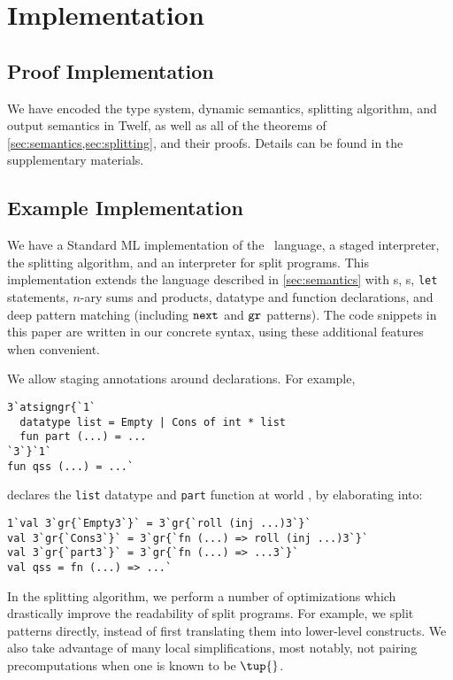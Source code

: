 
\section {Implementation}
\label{sec:implementation}

\subsection {Proof Implementation}

We have encoded the type system, dynamic semantics, splitting algorithm, and output semantics in Twelf,
as well as all of the theorems of \ref{sec:semantics,sec:splitting}, and their proofs. 
Details can be found in the supplementary materials.

\subsection {Example Implementation}

\begin{abstrsyn}
We have a Standard ML implementation of the \lang\ language, a staged
interpreter, the splitting algorithm, and an interpreter for split programs.
This implementation extends the language described in \ref{sec:semantics} with 
\rmint{}s,
\rmbool{}s,
\texttt{let} statements,
$n$-ary sums and products,
datatype and function declarations, and
deep pattern matching (including ${\tt next}{}$ and ${\tt gr}{}$ patterns).
The code snippets in this paper are written in our concrete syntax, using 
these additional features when convenient.

We allow staging annotations around declarations. For example,
\begin{lstlisting}
3`atsigngr{`1`
  datatype list = Empty | Cons of int * list
  fun part (...) = ...
`3`}`1`
fun qss (...) = ...`
\end{lstlisting}
declares the \texttt{list} datatype and \texttt{part} function at world \bbonep,
by elaborating into:
\begin{lstlisting}
1`val 3`gr{`Empty3`}` = 3`gr{`roll (inj ...)3`}`
val 3`gr{`Cons3`}` = 3`gr{`fn (...) => roll (inj ...)3`}`
val 3`gr{`part3`}` = 3`gr{`fn (...) => ...3`}`
val qss = fn (...) => ...`
\end{lstlisting}

In the splitting algorithm, we perform a number of optimizations which
drastically improve the readability of split programs. For example, we split
patterns directly, instead of first translating them into lower-level
constructs. We also take advantage of many local simplifications, most notably,
not pairing precomputations when one is known to be $\tup{}$.




\end{abstrsyn}
